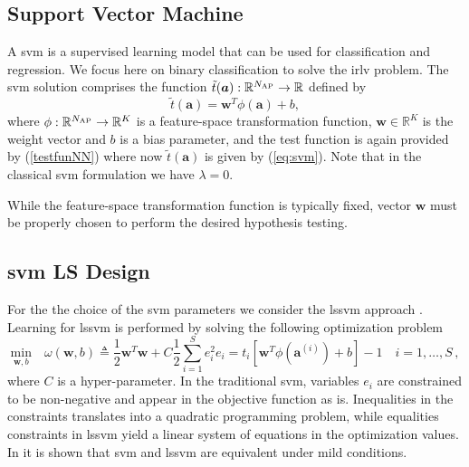 \documentclass[draftcls,onecolumn,12pt]{IEEEtran}
\begin{document}
\subsection{Support Vector Machine}\label{sec:svm}
A \ac{svm} \cite{Bishop2006} is a supervised learning model that can be used for classification and regression. We focus here on binary classification to solve the \ac{irlv} problem. The \ac{svm} solution comprises the function $\tilde{t}(\bm{a}): \mathbb{R}^{N_{\rm AP}} \to \mathbb{R}$ defined by
\begin{equation}
\label{eq:svm}
\tilde{t}(\bm{a}) = \bm{w}^T \phi (\bm{a}) + b,
\end{equation}
where $\phi: \mathbb{R}^{N_{\rm AP}} \to \mathbb{R}^K$ is a feature-space transformation function, $\bm{w} \in \mathbb{R}^K$ is the weight vector and $b$ is a bias parameter, and the test function is again provided by (\ref{testfunNN}) where now $\tilde{t}(\bm{a})$ is given by (\ref{eq:svm}). Note that in the classical \ac{svm} formulation we have $\lambda = 0$.

While the feature-space transformation function is typically fixed,  vector $\bm{w}$ must be properly chosen to perform the desired hypothesis testing. 

\subsection{\ac{svm} LS Design}

For the the choice of the \ac{svm} parameters we consider the \ac{lssvm} approach \cite{Suykens1999}.  Learning for \ac{lssvm} is performed by solving the following optimization problem
\begin{subequations}
	\label{eq:lssvm}
	\begin{equation}
	\label{eq:lssvmOrig}
	\underset{\bm{w},b }{\text{min}} \quad \omega(\bm{w},b) \triangleq \frac{1}{2} \bm{w}^T \bm{w} + C \frac{1}{2} \sum_{i=1}^S e_i ^2 
	\end{equation}
	\begin{equation}
	\label{eq:stpart}
	e_i =   t_i[\bm{w}^T \phi (\bm{a}^{(i)}) + b]-1   \quad i = 1 ,\dots,S\,,
	\end{equation}
\end{subequations}
where $C$ is a hyper-parameter. In the traditional \ac{svm}, variables $e_i$ are constrained to be non-negative and appear in the objective function as is. Inequalities in the constraints translates into a quadratic programming problem, while equalities constraints in \ac{lssvm} yield a linear system of equations in the optimization values. In \cite{Yevs} it is shown that \ac{svm} and \ac{lssvm} are equivalent under mild conditions.
\end{document}
